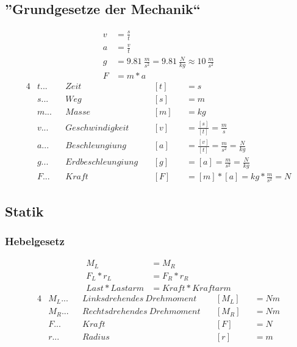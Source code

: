 \documentclass[12pt]{article}
\begin{document}
		\subsection{''Grundgesetze der Mechanik``}
			\begin{align*}
				v &= \frac{s}{t} \\
				a &= \frac{v}{t} \\
				g &= 9.81\ \frac{m}{s^2} = 9.81\ \frac{N}{kg} \approx 10\ \frac{m}{s^2} \\
				F &= m * a
			\end{align*}
			\begin{alignat*}{4}
				&t...&&Zeit              &&\ [t] &&= s \\
				&s...&&Weg               &&\ [s] &&= m \\
				&m...&&Masse             &&\ [m] &&= kg \\
				&v...&&Geschwindigkeit   &&\ [v] &&= \frac{[s]}{[t]} = \frac{m}{s} \\
				&a...&&Beschleungiung    &&\ [a] &&= \frac{[v]}{[t]} = \frac{m}{s^2} = \frac{N}{kg} \\
				&g...&&Erdbeschleungiung &&\ [g] &&= [a] = \frac{m}{s^2} = \frac{N}{kg} \\
				&F...&&Kraft             &&\ [F] &&= [m] * [a] = kg * \frac{m}{s^2} = N
			\end{alignat*}
		
		\subsection{Statik}
			\subsubsection{Hebelgesetz}
				\begin{align*}
					M_L &= M_R \\
					F_L * r_L &= F_R * r_R \\
					Last * Lastarm &= Kraft * Kraftarm
				\end{align*}
				\begin{alignat*}{4}
					&M_L...&&Linksdrehendes\ Drehmoment  &&\ [M_L] &&= Nm \\
					&M_R...&&Rechtsdrehendes\ Drehmoment &&\ [M_R] &&= Nm \\
					&F  ...&&Kraft                       &&\ [F]   &&= N \\
					&r  ...&&Radius                      &&\ [r]   &&= m
				\end{alignat*}
\end{document}
